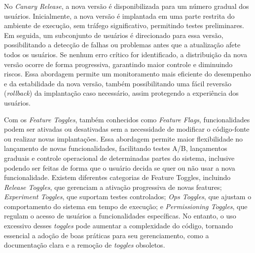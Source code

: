 No \emph{Canary Release}, a nova versão é disponibilizada para um número gradual dos usuários. Inicialmente, a nova versão é implantada em uma parte restrita do ambiente de execução, sem tráfego significativo, permitindo testes preliminares. Em seguida, um subconjunto de usuários é direcionado para essa versão, possibilitando a detecção de falhas ou problemas antes que a atualização afete todos os usuários. Se nenhum erro crítico for identificado, a distribuição da nova versão ocorre de forma progressiva, garantindo maior controle e diminuindo riscos. Essa abordagem permite um monitoramento mais eficiente do desempenho e da estabilidade da nova versão, também possibilitando uma fácil reversão (\emph{rollback}) da implantação caso necessário, assim protegendo a experiência dos usuários.
\cite{canary-release}

Com os \emph{Feature Toggles}, também conhecidos como \emph{Feature Flags}, funcionalidades podem ser ativadas ou desativadas sem a necessidade de modificar o código-fonte ou realizar novas implantações. Essa abordagem permite maior flexibilidade no lançamento de novas funcionalidades, facilitando testes A/B, lançamentos graduais e controle operacional de determinadas partes do sistema, inclusive podendo ser feitas de forma que o usuário decida se quer ou não usar a nova funcionalidade. Existem diferentes categorias de Feature Toggles, incluindo \emph{Release Toggles}, que gerenciam a ativação progressiva de novas features; \emph{Experiment Toggles}, que suportam testes controlados; \emph{Ops Toggles}, que ajustam o comportamento do sistema em tempo de execução; e \emph{Permissioning Toggles}, que regulam o acesso de usuários a funcionalidades específicas. No entanto, o uso excessivo desses \emph{toggles} pode aumentar a complexidade do código, tornando essencial a adoção de boas práticas para seu gerenciamento, como a documentação clara e a remoção de \emph{toggles} obsoletos.
\cite{feature-toggles}


